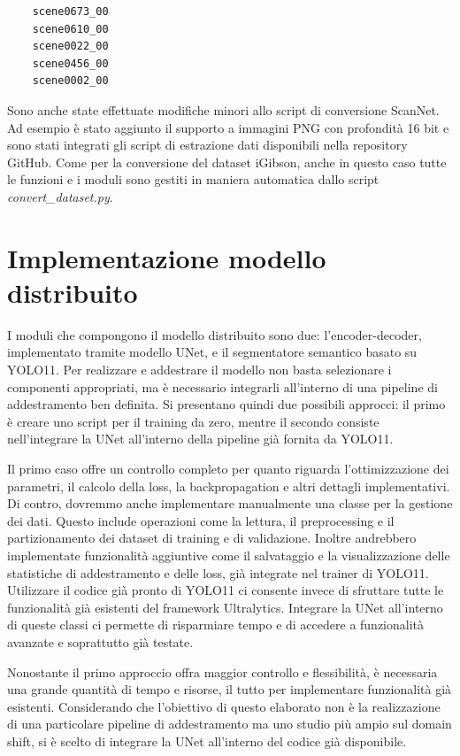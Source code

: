 \documentclass[12pt]{report}
\begin{document}
\begin{verbatim}
	scene0673_00
	scene0610_00
	scene0022_00
	scene0456_00
	scene0002_00
\end{verbatim}

Sono anche state effettuate modifiche minori allo script di conversione ScanNet. Ad esempio è stato aggiunto il supporto a immagini PNG con profondità 16 bit e sono stati integrati gli script di estrazione dati disponibili nella repository GitHub. Come per la conversione del dataset iGibson, anche in questo caso tutte le funzioni e i moduli sono gestiti in maniera automatica dallo script \textit{convert\_dataset.py}.

\section{Implementazione modello distribuito}
\label{sec:implementazione_modello_per_distribuito}

I moduli che compongono il modello distribuito sono due: l'encoder-decoder, implementato tramite modello UNet, e il segmentatore semantico basato su YOLO11. Per realizzare e addestrare il modello non basta selezionare i componenti appropriati, ma è necessario integrarli all'interno di una pipeline di addestramento ben definita. Si presentano quindi due possibili approcci: il primo è creare uno script per il training da zero, mentre il secondo consiste nell'integrare la UNet all'interno della pipeline già fornita da YOLO11.

Il primo caso offre un controllo completo per quanto riguarda l'ottimizzazione dei parametri, il calcolo della loss, la backpropagation e altri dettagli implementativi. Di contro, dovremmo anche implementare manualmente una classe per la gestione dei dati. Questo include operazioni come la lettura, il preprocessing e il partizionamento dei dataset di training e di validazione. Inoltre andrebbero implementate funzionalità aggiuntive come il salvataggio e la visualizzazione delle statistiche di addestramento e delle loss, già integrate nel trainer di YOLO11. Utilizzare il codice già pronto di YOLO11 ci consente invece di sfruttare tutte le funzionalità già esistenti del framework Ultralytics. Integrare la UNet all'interno di queste classi ci permette di risparmiare tempo e di accedere a funzionalità avanzate e soprattutto già testate.

Nonostante il primo approccio offra maggior controllo e flessibilità, è necessaria una grande quantità di tempo e risorse, il tutto per implementare funzionalità già esistenti. Considerando che l'obiettivo di questo elaborato non è la realizzazione di una particolare pipeline di addestramento ma uno studio più ampio sul domain shift, si è scelto di integrare la UNet all'interno del codice già disponibile.
\end{document}

